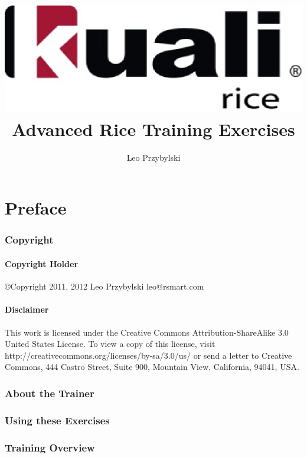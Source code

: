 \documentclass[letterpaper,notitlepage,12pt]{book}
\author{Leo Przybylski}
\title{\includegraphics[width=\textwidth]{cover.eps}\\Advanced Rice Training Exercises}
\date{}
\begin{document}
\maketitle

\part*{Preface}

\section*{Copyright}
\subsection*{Copyright Holder}
\copyright Copyright 2011, 2012
Leo Przybylski
leo@rsmart.com

\subsection*{Disclaimer}
This work is licensed under the Creative Commons Attribution-ShareAlike 3.0 United States License. To view a copy of this license, visit http://creativecommons.org/licenses/by-sa/3.0/us/ or send a letter to Creative Commons, 444 Castro Street, Suite 900, Mountain View, California, 94041, USA.

\section*{About the Trainer}

\section*{Using these Exercises}

\section*{Training Overview}

\tableofcontents






\end{document}
